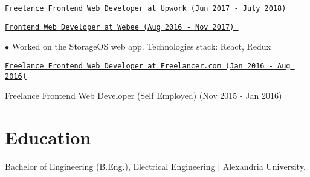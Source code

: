 \documentclass[letterpaper]{article}
\renewenvironment{itemize}{
  \begin{list}{}{
    \setlength{\leftmargin}{1.5em}
  }
}{
  \end{list}
}
\begin{document}
\begin{itemize}
\begin{itemize}
    \end{itemize}
  \item \href{https://www.upwork.com/o/profiles/users/_~014d7603bde62ae128/}{\tt Freelance Frontend Web Developer at Upwork (Jun 2017 - July 2018) }
  \item \href{https://www.web-design-malta.com/}{\tt Frontend Web Developer at Webee (Aug 2016 - Nov 2017) }
    \begin{itemize}
      \item $\bullet$ Worked on the StorageOS web app. Technologies stack: React, Redux
    \end{itemize}
  \item \href{https://www.freelancer.com/u/amrsekilly}{\tt Freelance Frontend Web Developer at Freelancer.com (Jan 2016 - Aug 2016)}
  \item Freelance Frontend Web Developer (Self Employed) (Nov 2015 - Jan 2016)
\end{itemize}

\section*{Education}

\begin{itemize}
  \item Bachelor of Engineering (B.Eng.), Electrical Engineering | Alexandria University.
\end{itemize}
\end{document}

